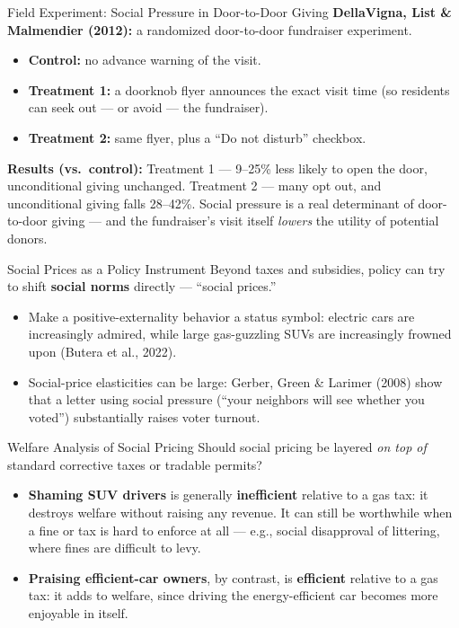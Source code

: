 \documentclass[11pt,aspectratio=169]{beamer}
\begin{document}
\begin{frame}{Field Experiment: Social Pressure in Door-to-Door Giving}
  \textbf{DellaVigna, List \& Malmendier (2012):} a randomized door-to-door fundraiser experiment.
  \begin{itemize}
    \item \textbf{Control:} no advance warning of the visit.
    \item \textbf{Treatment 1:} a doorknob flyer announces the exact visit time (so residents can seek out --- or avoid --- the fundraiser).
    \item \textbf{Treatment 2:} same flyer, plus a ``Do not disturb'' checkbox.
  \end{itemize}
  \textbf{Results (vs.\ control):} Treatment 1 --- 9--25\% less likely to open the door, unconditional giving unchanged. Treatment 2 --- many opt out, and unconditional giving falls 28--42\%.
  \vspace{0.3em}
  \small Social pressure is a real determinant of door-to-door giving --- and the fundraiser's visit itself \emph{lowers} the utility of potential donors.
\end{frame}

\begin{frame}{Social Prices as a Policy Instrument}
  Beyond taxes and subsidies, policy can try to shift \textbf{social norms} directly --- ``social prices.''
  \begin{itemize}
    \item Make a positive-externality behavior a status symbol: electric cars are increasingly admired, while large gas-guzzling SUVs are increasingly frowned upon (Butera et al., 2022).
    \item Social-price elasticities can be large: Gerber, Green \& Larimer (2008) show that a letter using social pressure (``your neighbors will see whether you voted'') substantially raises voter turnout.
  \end{itemize}
\end{frame}

\begin{frame}{Welfare Analysis of Social Pricing}
  Should social pricing be layered \emph{on top of} standard corrective taxes or tradable permits?
  \begin{itemize}
    \item \textbf{Shaming SUV drivers} is generally \textbf{inefficient} relative to a gas tax: it destroys welfare without raising any revenue. It can still be worthwhile when a fine or tax is hard to enforce at all --- e.g., social disapproval of littering, where fines are difficult to levy.
    \item \textbf{Praising efficient-car owners}, by contrast, is \textbf{efficient} relative to a gas tax: it adds to welfare, since driving the energy-efficient car becomes more enjoyable in itself.
  \end{itemize}
\end{frame}
\end{document}
